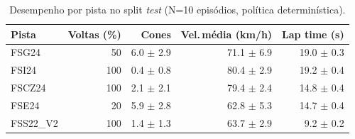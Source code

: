 \begin{table}[H]
\centering
\caption{Desempenho por pista no split \textit{test} (N=10 episódios, política determinística).}
\label{tab:per_track_test}
\begin{tabular}{lrrrr}
\toprule
\textbf{Pista} & \textbf{Voltas (\%)} & \textbf{Cones} & \textbf{Vel.\,m\'edia (km/h)} & \textbf{Lap time (s)} \\
\midrule
FSG24 & 50 & 6.0 $\pm$ 2.9 & 71.1 $\pm$ 6.9 & 19.0 $\pm$ 0.3 \\
FSI24 & 100 & 0.4 $\pm$ 0.8 & 80.4 $\pm$ 2.9 & 19.2 $\pm$ 0.4 \\
FSCZ24 & 100 & 2.1 $\pm$ 2.1 & 79.4 $\pm$ 2.4 & 14.8 $\pm$ 0.4 \\
FSE24 & 20 & 5.9 $\pm$ 2.8 & 62.8 $\pm$ 5.3 & 14.7 $\pm$ 0.4 \\
FSS22_V2 & 100 & 1.4 $\pm$ 1.3 & 63.7 $\pm$ 2.9 & 9.2 $\pm$ 0.2 \\
\bottomrule
\end{tabular}
\end{table}
